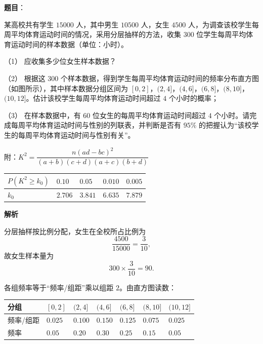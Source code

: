 \begin{answer}

\textbf{题目}：

某高校共有学生 $15000$ 人，其中男生 $10500$ 人，女生 $4500$ 人，为调查该校学生每周平均体育运动时间的情况，采用分层抽样的方法，收集 $300$ 位学生每周平均体育运动时间的样本数据（单位：小时）。
\nopagebreak[4]
\begin{center}\end{center}
\nopagebreak[4]
（1） 应收集多少位女生样本数据？

（2） 根据这 $300$ 个样本数据，得到学生每周平均体育运动时间的频率分布直方图（如图所示），其中样本数据分组区间为 $[0,2]$，$(2,4]$，$(4,6]$，$(6,8]$，$(8,10]$，$(10,12]$。估计该校学生每周平均体育运动时间超过 $4$ 个小时的概率；

（3） 在样本数据中，有 $60$ 位女生的每周平均体育运动时间超过 $4$ 个小时。请完成每周平均体育运动时间与性别的列联表，并判断是否有 $95\%$ 的把握认为“该校学生的每周平均体育运动时间与性别有关”。

附：$K^2=\dfrac{n(ad-bc)^2}{(a+b)(c+d)(a+c)(b+d)}$

\begin{center}
\begin{tabular}{lllll}
\toprule
$P(K^2\geqslant k_0)$ & $0.10$ & $0.05$ & $0.010$ & $0.005$ \\
\midrule
$k_0$ & $2.706$ & $3.841$ & $6.635$ & $7.879$ \\
\bottomrule
\end{tabular}
\end{center}

\textbf{解析}


分层抽样按比例分配，女生在全校所占比例为
\nopagebreak[4]
\[\frac{4500}{15000}=\frac3{10},\]
故女生样本量为
\nopagebreak[4]
\[300\times\frac3{10}=90 .\]


各组频率等于“频率/组距”乘以组距 $2$。由直方图读数：

\begin{center}
\begin{tabular}{lllllll}
\toprule
分组 & $[0,2]$ & $(2,4]$ & $(4,6]$ & $(6,8]$ & $(8,10]$ & $(10,12]$ \\
\midrule
频率/组距 & $0.025$ & $0.100$ & $0.150$ & $0.125$ & $0.075$ & $0.025$ \\
频率 & $0.05$ & $0.20$ & $0.30$ & $0.25$ & $0.15$ & $0.05$ \\
\bottomrule
\end{tabular}
\end{center}


\end{answer}
